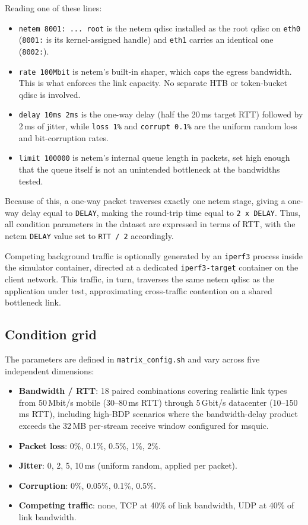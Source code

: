 Reading one of these lines:
\begin{itemize}
    \item \texttt{netem 8001: ... root} is the netem qdisc installed as the
          root qdisc on \texttt{eth0} (\texttt{8001:} is its kernel-assigned
          handle) and \texttt{eth1} carries an identical one (\texttt{8002:}).
    \item \texttt{rate 100Mbit} is netem's built-in shaper, which caps the
          egress bandwidth. This is what enforces the link capacity. No separate
          HTB or token-bucket qdisc is involved.
    \item \texttt{delay 10ms 2ms} is the one-way delay (half the 20\,ms target
          RTT) followed by 2\,ms of jitter, while \texttt{loss 1\%} and
          \texttt{corrupt 0.1\%} are the uniform random loss and bit-corruption
          rates.
    \item \texttt{limit 100000} is netem's internal queue length in packets, set
          high enough that the queue itself is not an unintended bottleneck at
          the bandwidths tested.
\end{itemize}

Because of this, a one-way packet traverses exactly one netem stage, giving
a one-way delay equal to \texttt{DELAY}, making the round-trip time equal to
\texttt{2 x DELAY}. Thus, all condition parameters in the dataset are expressed in terms
of RTT, with the netem \texttt{DELAY} value set to \texttt{RTT / 2} accordingly.

Competing background traffic is optionally generated by an \texttt{iperf3}
process inside the simulator container, directed at a dedicated
\texttt{iperf3-target} container on the client network. This traffic, in turn, traverses
the same netem qdisc as the application under test, approximating cross-traffic
contention on a shared bottleneck link.

\subsection{Condition grid}
\label{subsec:condition-grid}

The parameters are defined in \texttt{matrix\_config.sh} and vary across
five independent dimensions:

\begin{itemize}
    \item \textbf{Bandwidth / RTT}: 18 paired combinations covering realistic
          link types from 50\,Mbit/s mobile (30--80\,ms RTT) through 5\,Gbit/s
          datacenter (10--150\,ms RTT), including high-BDP scenarios where the
          bandwidth-delay product exceeds the 32\,MB per-stream receive window
          configured for msquic.
    \item \textbf{Packet loss}: 0\%, 0.1\%, 0.5\%, 1\%, 2\%.
    \item \textbf{Jitter}: 0, 2, 5, 10\,ms (uniform random, applied per packet).
    \item \textbf{Corruption}: 0\%, 0.05\%, 0.1\%, 0.5\%.
    \item \textbf{Competing traffic}: none, TCP at 40\% of link bandwidth,
          UDP at 40\% of link bandwidth.
\end{itemize}

